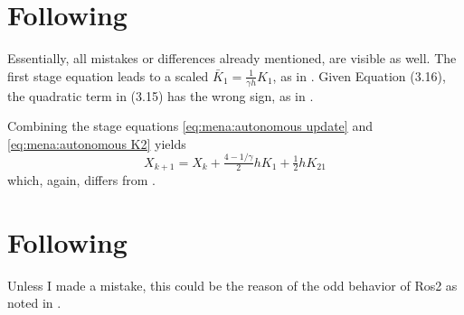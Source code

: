 \section{Following \cite{MPIMD12-13}}

Essentially, all mistakes or differences already mentioned, are visible as well.
The first stage equation \cite[Equation (3.14)]{MPIMD12-13} leads to a scaled $\bar{K}_1 = \frac{1}{\gamma h}K_1$, as in \cite{MPIMD11-06}.
Given Equation (3.16), the quadratic term in (3.15) has the wrong sign, as in \cite{Mena2007}.

Combining the stage equations \eqref{eq:mena:autonomous update} and \eqref{eq:mena:autonomous K2} yields
\begin{equation}
  X_{k+1} = X_k + \tfrac{4 - 1/\gamma}{2} h K_1 + \tfrac{1}{2} h K_{21}
\end{equation}
which, again, differs from \cite[Equation~(3.17)]{MPIMD12-13}.

\section{Following \cite{Lang2015}}

Unless I made a mistake, this could be the reason of the odd behavior of Ros2 as noted in \cite[63]{Lang2015}.
